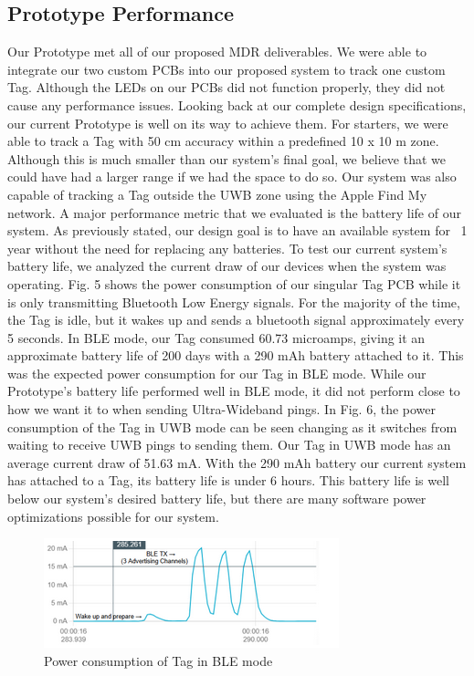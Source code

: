 \documentclass[conference]{IEEEtran}
\begin{document}
\subsection{Prototype Performance}
Our Prototype met all of our proposed MDR deliverables. We were able to 
integrate our two custom PCBs into our proposed system to track one custom 
Tag. Although the LEDs on our PCBs did not function properly, they did not 
cause any performance issues. Looking back at our complete design 
specifications, our current Prototype is well on its way to achieve them. 
For starters, we were able to track a Tag with 50 cm accuracy within a 
predefined 10 x 10 m zone. Although this is much smaller than our system’s 
final goal, we believe that we could have had a larger range if we had the 
space to do so. Our system was also capable of tracking a Tag outside the 
UWB zone using the Apple Find My network. A major performance metric that 
we evaluated is the battery life of our system. As previously stated, our 
design goal is to have an available system for ~1 year without the need for 
replacing any batteries. To test our current system’s battery life, we 
analyzed the current draw of our devices when the system was operating. 
Fig. 5 shows the power consumption of our singular Tag PCB while it is 
only transmitting Bluetooth Low Energy signals. For the majority of the 
time, the Tag is idle, but it wakes up and sends a bluetooth signal 
approximately every 5 seconds. In BLE mode, our Tag consumed 60.73 
microamps, giving it an approximate battery life of 200 days with a 
290 mAh battery attached to it. This was the expected power consumption 
for our Tag in BLE mode. While our Prototype’s battery life performed well 
in BLE mode, it did not perform close to how we want it to when sending 
Ultra-Wideband pings. In Fig. 6, the power consumption of the Tag in UWB 
mode can be seen changing as it switches from waiting to receive UWB pings 
to sending them. Our Tag in UWB mode has an average current draw of 51.63 
mA. With the 290 mAh battery our current system has attached to a Tag, its 
battery life is under 6 hours. This battery life is well below our system’s 
desired battery life, but there are many software power optimizations possible
for our system.

\begin{figure}
\begin{center}
\includegraphics[scale=1]{mdr_ble_power_consumption.png}
\caption{Power consumption of Tag in BLE mode}
\end{center}
\end{figure}
\end{document}
